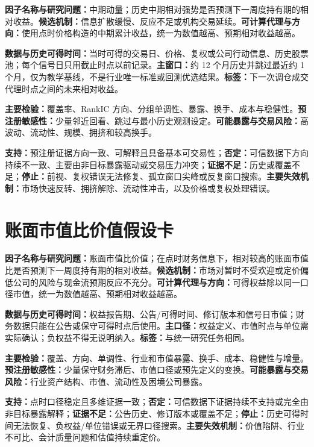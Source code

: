 \begin{casebox}[title={中期动量假设卡}]
\textbf{因子名称与研究问题：}中期动量；历史中期相对强势是否预测下一周度持有期的相对收益。\textbf{候选机制：}信息扩散缓慢、反应不足或机构交易延续。\textbf{可计算代理与方向：}使用点时价格构造的中期累计收益，统一为数值越高、预期相对收益越高。

\textbf{数据与历史可得时间：}当时可得的交易日、价格、复权或公司行动信息、历史股票池；每个信号日只用截止时点以前记录。\textbf{主窗口：}约 12 个月历史并跳过最近约 1 个月，仅为教学基线，不是行业唯一标准或回测优选结果。\textbf{标签：}下一次调仓成交代理时点之间的未来相对收益。

\textbf{主要检验：}覆盖率、RankIC 方向、分组单调性、暴露、换手、成本与稳健性。\textbf{预注册敏感性：}少量邻近回看、跳过与最小历史观测设定。\textbf{可能暴露与交易风险：}高波动、流动性、规模、拥挤和较高换手。

\textbf{支持：}预注册证据方向一致、可解释且具备基本可交易性；\textbf{否定：}可信数据下方向持续不一致、主要由非目标暴露驱动或交易压力冲突；\textbf{证据不足：}历史或覆盖不足；\textbf{停止：}前视、复权错误无法修复、孤立窗口尖峰或反复窗口搜索。\textbf{主要失效机制：}市场快速反转、拥挤解除、流动性冲击，以及价格或复权处理错误。
\end{casebox}

\section{账面市值比价值假设卡}

\begin{casebox}[title={账面市值比价值假设卡}]
\textbf{因子名称与研究问题：}账面市值比价值；在点时财务信息下，相对较高的账面市值比是否预测下一周度持有期的相对收益。\textbf{候选机制：}市场对暂时不受欢迎或定价偏低公司的风险与现金流预期反应不充分。\textbf{可计算代理与方向：}可得权益除以同一口径市值，统一为数值越高、预期相对收益越高。

\textbf{数据与历史可得时间：}权益报告期、公告/可得时间、修订版本和信号日市值；财务数据只能在公告或保守可得时点后使用。\textbf{主口径：}权益定义、市值时点与单位需实际确认；负权益不得无说明纳入。\textbf{标签：}与统一研究任务相同。

\textbf{主要检验：}覆盖、方向、单调性、行业和市值暴露、换手、成本、稳健性与增量。\textbf{预注册敏感性：}少量保守财务滞后、市值口径或预先定义的变换。\textbf{可能暴露与交易风险：}行业资产结构、市值、流动性及困境公司暴露。

\textbf{支持：}点时口径稳定且多维证据一致；\textbf{否定：}可信数据下证据持续不支持或完全由非目标暴露解释；\textbf{证据不足：}公告历史、修订版本或覆盖不足；\textbf{停止：}历史可得时间无法恢复、负权益/单位错误或无界口径搜索。\textbf{主要失效机制：}价值陷阱、行业不可比、会计质量问题和估值持续重定价。
\end{casebox}


